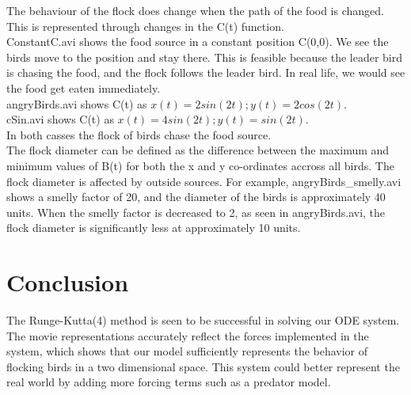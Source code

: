 \documentclass[12pt]{article}
\begin{document}
The behaviour of the flock does change when the path of the food is changed. This is represented through changes in the C(t) function. \\ ConstantC.avi shows the food source in a constant position C(0,0). We see the birds move to the position and stay there. This is feasible because the leader bird is chasing the food, and the flock follows the leader bird. In real life, we would see the food get eaten immediately.
\\ angryBirds.avi shows C(t) as $x(t) = 2sin(2t); y(t) = 2cos(2t)$. \\ cSin.avi shows C(t) as $x(t) = 4sin(2t); y(t) = sin(2t)$.
\\ In both casses the flock of birds chase the food source. \\ The flock diameter can be defined as the difference between the maximum and minimum values of B(t) for both the x and y co-ordinates accross all birds. The flock diameter is affected by outside sources. For example, angryBirds\_smelly.avi shows a smelly factor of 20, and the diameter of the birds is approximately 40 units. When the smelly factor is decreased to 2, as seen in angryBirds.avi, the flock diameter is significantly less at approximately 10 units.
	
    \section{Conclusion}
     The Runge-Kutta(4) method is seen to be successful in solving our ODE system. The movie representations accurately reflect the forces implemented in the system, which shows that our model sufficiently represents the behavior of flocking birds in a two dimensional space. This system could better represent the real world by adding more forcing terms such as a predator model. 
\end{document}
